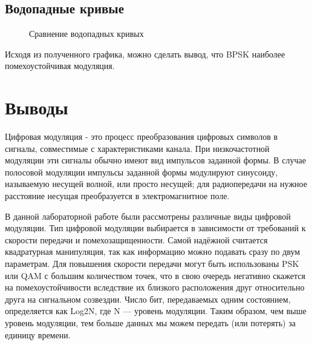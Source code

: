 \documentclass[a4paper,14pt]{extarticle}
\begin{document}
\subsection{Водопадные кривые}

\begin{figure}[H]
\caption{Сравнение водопадных кривых}
\label{13}
\end{figure}

Исходя из полученного графика, можно сделать вывод, что BPSK наиболее помехоустойчивая модуляция.

\section{Выводы}
Цифровая модуляция - это процесс преобразования цифровых символов в сигналы, совместимые с характеристиками канала. При низкочастотной модуляции эти сигналы обычно имеют вид импульсов заданной формы. В случае полосовой модуляции импульсы заданной формы модулируют синусоиду, называемую несущей волной, или просто несущей; для радиопередачи на нужное расстояние несущая преобразуется в электромагнитное поле.

В данной лабораторной работе были рассмотрены различные виды цифровой модуляции. Тип цифровой модуляции выбирается в зависимости от требований к скорости передачи и помехозащищенности. Самой надёжной считается квадратурная манипуляция, так как информацию можно подавать сразу по двум параметрам. Для повышения скорости передачи могут быть использованы PSK или QAM с большим количеством точек, что в свою очередь негативно скажется на помехоустойчивости вследствие их близкого расположения друг относительно друга на сигнальном созвездии.
Число бит, передаваемых одним состоянием, определяется как Log2N, где N — уровень модуляции. Таким образом, чем выше уровень модуляции, тем больше данных мы можем передать (или потерять) за единицу времени. 
\end{document}

